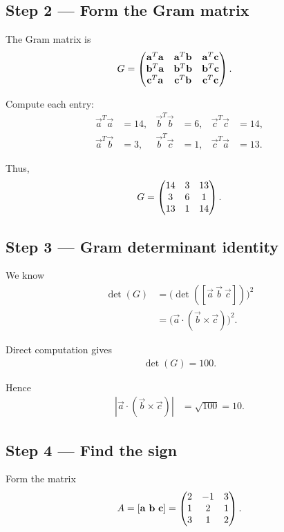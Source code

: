 \documentclass[12pt]{article}
\begin{document}
\subsection*{Step 2 — Form the Gram matrix}
The Gram matrix is
\begin{align}
G &=
\begin{pmatrix}
\mathbf{a}^T \mathbf{a} & \mathbf{a}^T \mathbf{b} & \mathbf{a}^T \mathbf{c} \\
\mathbf{b}^T \mathbf{a} & \mathbf{b}^T \mathbf{b} & \mathbf{b}^T \mathbf{c} \\
\mathbf{c}^T \mathbf{a} & \mathbf{c}^T \mathbf{b} & \mathbf{c}^T \mathbf{c}
\end{pmatrix}.
\end{align}

Compute each entry:
\begin{align}
\vec{a}^T \vec{a} &= 14, &
\vec{b}^T \vec{b} &= 6, &
\vec{c}^T \vec{c} &= 14, \\
\vec{a}^T \vec{b} &= 3, &
\vec{b}^T \vec{c} &= 1, &
\vec{c}^T \vec{a} &= 13.
\end{align}

Thus,
\begin{align}
G = \begin{pmatrix}
14 & 3 & 13 \\
3 & 6 & 1 \\
13 & 1 & 14
\end{pmatrix}.
\end{align}

\subsection*{Step 3 — Gram determinant identity}
We know
\begin{align}
\det(G) &= \big(\det([\vec{a}\ \vec{b}\ \vec{c}])\big)^2 \\
        &= \big(\vec{a} \cdot (\vec{b} \times \vec{c})\big)^2.
\end{align}

Direct computation gives
\begin{align}
\det(G) = 100.
\end{align}

Hence
\begin{align}
|\vec{a} \cdot (\vec{b} \times \vec{c})| &= \sqrt{100} = 10.
\end{align}

\subsection*{Step 4 — Find the sign}
Form the matrix
\begin{align}
A = [\mathbf{a}\ \mathbf{b}\ \mathbf{c}] =
\begin{pmatrix}
2 & -1 & 3 \\
1 & 2  & 1 \\
3 & 1  & 2
\end{pmatrix}.
\end{align}
\end{document}
